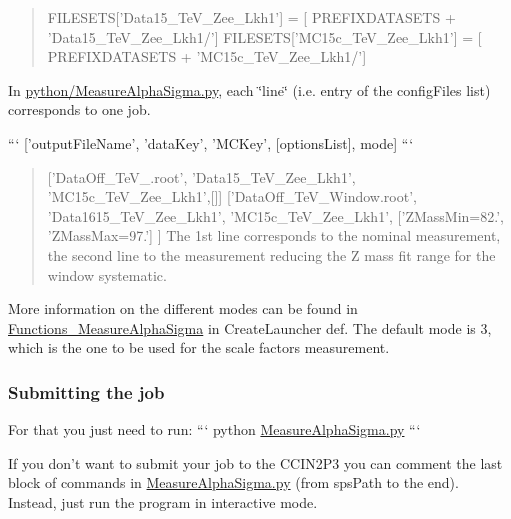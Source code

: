 \begin{quote}
F\+I\+L\+E\+S\+E\+T\+S\mbox{[}'Data15\+\_\+Te\+V\+\_\+\+Zee\+\_\+\+Lkh1'\mbox{]} = \mbox{[} P\+R\+E\+F\+I\+X\+D\+A\+T\+A\+S\+E\+T\+S + 'Data15\+\_\+Te\+V\+\_\+\+Zee\+\_\+\+Lkh1/'\mbox{]} F\+I\+L\+E\+S\+E\+T\+S\mbox{[}'M\+C15c\+\_\+Te\+V\+\_\+\+Zee\+\_\+\+Lkh1'\mbox{]} = \mbox{[} P\+R\+E\+F\+I\+X\+D\+A\+T\+A\+S\+E\+T\+S + 'M\+C15c\+\_\+Te\+V\+\_\+\+Zee\+\_\+\+Lkh1/'\mbox{]} \end{quote}



\begin{DoxyItemize}
\item In \hyperlink{MeasureAlphaSigma_8py}{python/\+Measure\+Alpha\+Sigma.\+py}, each \char`\"{}line\char`\"{} (i.\+e. entry of the config\+Files list) corresponds to one job.
\end{DoxyItemize}

``` \mbox{[}'output\+File\+Name', 'data\+Key', 'M\+C\+Key', \mbox{[}options\+List\mbox{]}, mode\mbox{]} ```

\begin{quote}
\mbox{[}'Data\+Off\+\_\+Te\+V\+\_.\+root', 'Data15\+\_\+Te\+V\+\_\+\+Zee\+\_\+\+Lkh1', 'M\+C15c\+\_\+Te\+V\+\_\+\+Zee\+\_\+\+Lkh1',\mbox{[}\mbox{]}\mbox{]} \mbox{[}'Data\+Off\+\_\+Te\+V\+\_\+\+Window.\+root', 'Data1615\+\_\+Te\+V\+\_\+\+Zee\+\_\+\+Lkh1', 'M\+C15c\+\_\+Te\+V\+\_\+\+Zee\+\_\+\+Lkh1', \mbox{[}'Z\+Mass\+Min=82.', 'Z\+Mass\+Max=97.'\mbox{]} \mbox{]} The 1st line corresponds to the nominal measurement, the second line to the measurement reducing the Z mass fit range for the window systematic. \end{quote}


More information on the different modes can be found in \hyperlink{namespaceFunctions__MeasureAlphaSigma}{Functions\+\_\+\+Measure\+Alpha\+Sigma} in Create\+Launcher def. The default mode is 3, which is the one to be used for the scale factors measurement.

\subsubsection*{Submitting the job}

For that you just need to run\+: ``` python \hyperlink{MeasureAlphaSigma_8py}{Measure\+Alpha\+Sigma.\+py} ```

If you don't want to submit your job to the C\+C\+I\+N2\+P3 you can comment the last block of commands in \hyperlink{MeasureAlphaSigma_8py}{Measure\+Alpha\+Sigma.\+py} (from sps\+Path to the end). Instead, just run the program in interactive mode.

